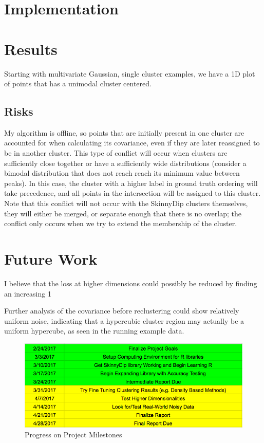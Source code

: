 \documentclass{sig-alternate-05-2015}
\begin{document}
\section{Implementation}



\section{Results} \label{results}
Starting with multivariate Gaussian, single cluster examples, we have a 1D plot of points that has a unimodal cluster centered.

\subsection{Risks}
My algorithm is offline, so points that are initially present in one cluster are accounted for when calculating its covariance, even if they are later reassigned to be in another cluster. This type of conflict will occur when clusters are sufficiently close together or have a sufficiently wide distributions (consider a bimodal distribution that does not reach reach its minimum value between peaks). In this case, the cluster with a higher label in ground truth ordering will take precedence, and all points in the intersection will be assigned to this cluster. Note that this conflict will not occur with the SkinnyDip clusters themselves, they will either be merged, or separate enough that there is no overlap; the conflict only occurs when we try to extend the membership of the cluster.


\section{Future Work}
I believe that the loss at higher dimensions could possibly be reduced by finding an increasing  1


Further analysis of the covariance before reclustering could show relatively uniform noise, indicating that a hypercubic cluster region may actually be a uniform hypercube, as seen in the running example data.


\begin{figure}[t]
\centering
\includegraphics[width=\textwidth]{images/newtimeline}
\caption{Progress on Project Milestones}
\label{fig:newmilestones}
\end{figure}





\end{document}
